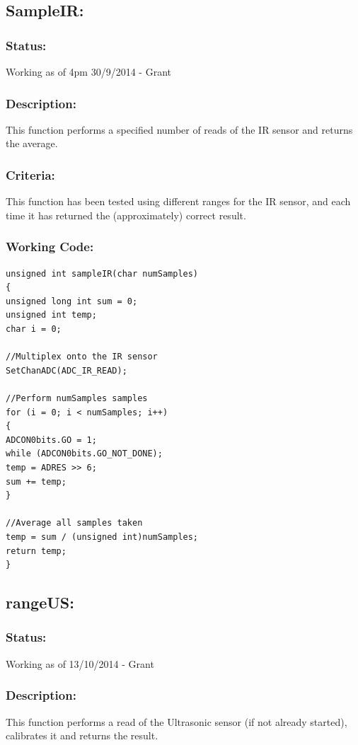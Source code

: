 \documentclass[]{report}
\begin{document}
\subsection{SampleIR:}
\subsubsection{Status:}
Working as of 4pm 30/9/2014 - Grant

\subsubsection{Description:}
This function performs a specified number of reads of the IR sensor and returns the average.

\subsubsection{Criteria:}
This function has been tested using different ranges for the IR sensor, and each time it has returned the (approximately) correct result.

\subsubsection{Working Code:}
\begin{lstlisting}
unsigned int sampleIR(char numSamples)
{
unsigned long int sum = 0;
unsigned int temp;
char i = 0;

//Multiplex onto the IR sensor
SetChanADC(ADC_IR_READ);

//Perform numSamples samples
for (i = 0; i < numSamples; i++)
{
ADCON0bits.GO = 1;
while (ADCON0bits.GO_NOT_DONE);
temp = ADRES >> 6;
sum += temp;
}

//Average all samples taken
temp = sum / (unsigned int)numSamples;
return temp;
}
\end{lstlisting}

\subsection{rangeUS:}
\subsubsection{Status:}
Working as of 13/10/2014 - Grant

\subsubsection{Description:}
This function performs a read of the Ultrasonic sensor (if not already started), calibrates it and returns the result.
\end{document}
